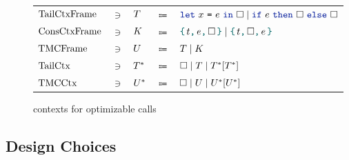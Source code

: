 \begin{figure}[tp]
    \begin{tabular}{lclcl}
            $\datalangTailFrame[]$
            & $\ni$ &
            $\datalangTailFrame$
            & $\Coloneqq$ &
            $\datalangLet {\datalangVar} {\datalangExpr} \datalangCtxHole \mid \datalangIf \datalangExpr \datalangCtxHole \datalangCtxHole$
\\
            $\datalangConsFrame[]$
            & $\ni$ &
            $\datalangConsFrame$
            & $\Coloneqq$ &
            $\datalangBlock \datalangTag \datalangExpr \datalangCtxHole
            \mid \datalangBlock \datalangTag \datalangCtxHole \datalangExpr$
\\
            $\datalangTMCFrame[]$
            & $\ni$ &
            $\datalangTMCFrame$
            & $\Coloneqq$ &
            $\datalangTailFrame
             \mid
             \datalangConsFrame$
\\
            $\datalangTailCtx[]$
            & $\ni$ &
            $\datalangTailCtx$
            & $\Coloneqq$ &
            $\datalangCtxHole
             \mid
             \datalangTailFrame
             \mid
             \datalangTailCtx{[\datalangTailCtx]}$
\\
            $\datalangTMCCtx[]$
            & $\ni$ &
            $\datalangTMCCtx$
            & $\Coloneqq$ &
            $\datalangCtxHole
             \mid
             \datalangTMCFrame
             \mid
             \datalangTMCCtx{[\datalangTMCCtx]}$
    \end{tabular}
    \caption{\DataLang contexts for optimizable calls}
    \label{fig:contexts}
\end{figure}

\subsection{Design Choices}

